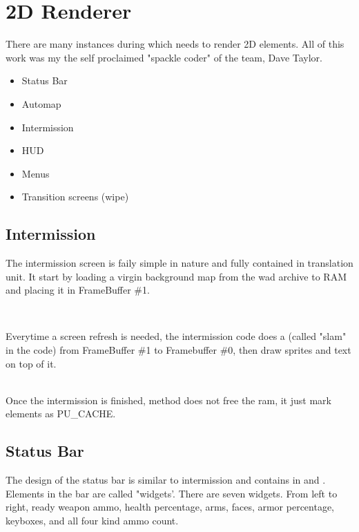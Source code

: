 \pagebreak
\section{2D Renderer}
There are many instances during which \doom needs to render 2D elements. All of this work was my the self proclaimed "spackle coder" of the team, Dave Taylor.\\
\begin{itemize}
\item Status Bar
\item Automap
\item Intermission
\item HUD
\item Menus
\item Transition screens (wipe)
\end{itemize} 
\par
{}



\subsection{Intermission}
The intermission screen is faily simple in nature and fully contained in  translation unit. It start by loading a virgin background map from the wad archive to RAM and placing it in FrameBuffer \#1.\\
\par
{}\\
\par
Everytime a screen refresh is needed, the intermission code does a  (called "slam" in the code) from FrameBuffer \#1 to Framebuffer \#0, then draw sprites and text on top of it.\\
\par
{}\\

Once the intermission is finished, method  does not free the ram, it just mark elements as PU\_CACHE.\\




\par

\subsection{Status Bar}
The design of the status bar is similar to intermission and contains in  and . Elements in the bar are called "widgets'. There are seven widgets. From left to right, ready weapon ammo, health percentage, arms, faces, armor percentage, keyboxes, and all four kind ammo count.\\
\par
{}
\par
{}\\

